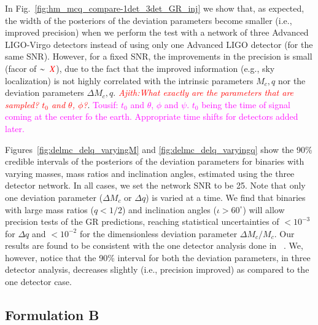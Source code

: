\documentclass[prd,preprintnumbers,twocolumn,eqsecnum,floatfix,a4paper,nofootinbib,superscriptaddress]{revtex4}
\newcommand{\red}[1]{\textcolor{red}{#1}}
\newcommand{\ajith}[1]{\textcolor{red}{\textit{Ajith:#1}}}
\newcommand{\tousif}[1]{\textcolor{magenta}{Tousif: #1}}
\begin{document}
In Fig.~\ref{fig:hm_mcq_compare-1det_3det_GR_inj} we show that, as expected, the width of the posteriors of the deviation parameters become smaller (i.e., improved precision) when we perform the test with a network of three Advanced LIGO-Virgo detectors instead of using only one Advanced LIGO detector (for the same SNR). However, for a fixed SNR, the improvements in the precision is small (facor of $\sim ~\red{X}$), due to the fact that the improved information (e.g., sky localization) is not highly correlated with the intrinsic parameters $M_c, q$ nor the deviation parameters $\Delta M_c, q$. %
\ajith{What exactly are the parameters that are sampled? $t_0$ and $\theta$, $\phi$?}. \tousif{ $t_0$ and $\theta$, $\phi$ and $\psi$. $t_0$ being the time of signal coming at the center fo the earth. Appropriate time shifts for detectors added later.}

 Figures~\ref{fig:delmc_delq_varyingM} and \ref{fig:delmc_delq_varyingq} show the 90\% credible intervals of the posteriors of the deviation parameters for binaries with varying masses, mass ratios and inclination angles, estimated using the three detector network. In all cases, we set the network SNR to be {25}. Note that only one deviation parameter ($\Delta M_c$ or $\Delta q$) is varied at a time.  We find that binaries with large mass ratios ($q < 1/ 2$) and inclination angles ($\iota > 60 ^\circ $) will allow precision tests of the GR predictions, reaching statistical uncertainties of $< 10^{-3}$ for $\Delta q$ and $< 10^{-2}$ for the dimensionless deviation parameter $\Delta M_c/M_c$. Our results are found to be consistent with the one detector analysis done in ~\cite{dhanpal2018}. We, however, notice that the 90\% interval for both the deviation parameters, in three detector analysis, decreases slightly (i.e., precision improved) as compared to the one detector case.
 
\subsection{Formulation B}
\label{sec:formulationB}
\end{document}
